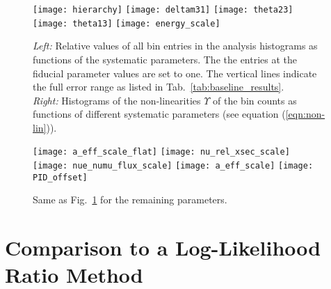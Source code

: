 \begin{figure}[p]
 \centering
 \texttt{[image: hierarchy]}
 \texttt{[image: deltam31]}
 \texttt{[image: theta23]}
 \texttt{[image: theta13]}
 \texttt{[image: energy\_scale]}
 \caption{\emph{Left:} Relative values of all bin entries in the analysis
  histograms as functions of the systematic parameters. The the entries at the 
  fiducial parameter values are set to one. The vertical lines indicate the full
  error range as listed in Tab.~\ref{tab:baseline_results}. \\
  \emph{Right:} Histograms of the non-linearities $\Upsilon$ of the bin counts
  as functions of different systematic parameters (see equation
  (\ref{eqn:non-lin})).}
 \label{fig:nonlinearities1}
\end{figure}

\begin{figure}[p]
 \centering
 \texttt{[image: a\_eff\_scale\_flat]}
 \texttt{[image: nu\_rel\_xsec\_scale]}
 \texttt{[image: nue\_numu\_flux\_scale]}
 \texttt{[image: a\_eff\_scale]}
 \texttt{[image: PID\_offset]}
 \caption{Same as Fig.~\ref{fig:nonlinearities1} for the remaining parameters.}
 \label{fig:nonlinearities2}
\end{figure}

\section*{\label{app:LLR}\thesection\enskip Comparison
to a Log-Likelihood Ratio Method}

